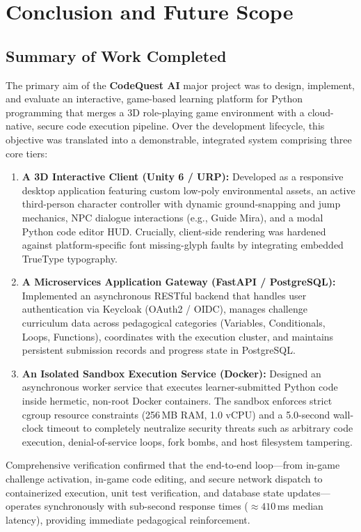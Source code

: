 \chapter{Conclusion and Future Scope}
\label{ch:conclusion}

\section{Summary of Work Completed}
The primary aim of the \textbf{CodeQuest AI} major project was to design, implement, and evaluate an interactive, game-based learning platform for Python programming that merges a 3D role-playing game environment with a cloud-native, secure code execution pipeline. Over the development lifecycle, this objective was translated into a demonstrable, integrated system comprising three core tiers:

\begin{enumerate}
    \item \textbf{A 3D Interactive Client (Unity 6 / URP):} Developed as a responsive desktop application featuring custom low-poly environmental assets, an active third-person character controller with dynamic ground-snapping and jump mechanics, NPC dialogue interactions (e.g., Guide Mira), and a modal Python code editor HUD. Crucially, client-side rendering was hardened against platform-specific font missing-glyph faults by integrating embedded TrueType typography.
    \item \textbf{A Microservices Application Gateway (FastAPI / PostgreSQL):} Implemented an asynchronous RESTful backend that handles user authentication via Keycloak (OAuth2 / OIDC), manages challenge curriculum data across pedagogical categories (Variables, Conditionals, Loops, Functions), coordinates with the execution cluster, and maintains persistent submission records and progress state in PostgreSQL.
    \item \textbf{An Isolated Sandbox Execution Service (Docker):} Designed an asynchronous worker service that executes learner-submitted Python code inside hermetic, non-root Docker containers. The sandbox enforces strict cgroup resource constraints (256\,MB RAM, 1.0 vCPU) and a 5.0-second wall-clock timeout to completely neutralize security threats such as arbitrary code execution, denial-of-service loops, fork bombs, and host filesystem tampering.
\end{enumerate}

Comprehensive verification confirmed that the end-to-end loop—from in-game challenge activation, in-game code editing, and secure network dispatch to containerized execution, unit test verification, and database state updates—operates synchronously with sub-second response times ($\approx 410$\,ms median latency), providing immediate pedagogical reinforcement.

